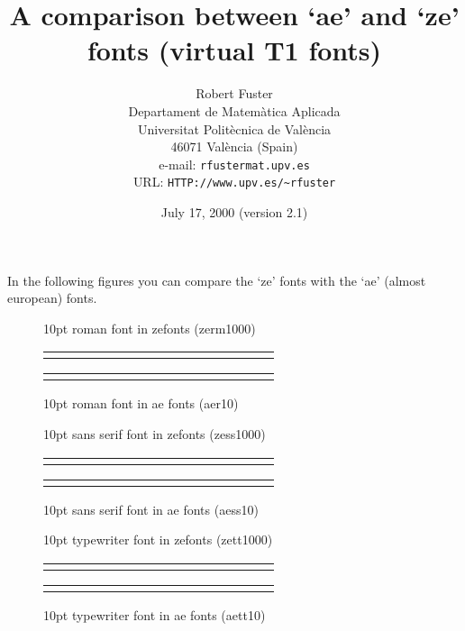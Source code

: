 \documentclass{article}
\title{A comparison between `ae' and `ze' fonts
       (virtual T1 fonts)}
\author{Robert Fuster\\
        \footnotesize Departament de Matem\`atica Aplicada\\
        \footnotesize Universitat Polit\`ecnica de Val\`encia\\
        \footnotesize 46071 Val\`encia (Spain)\\
        \footnotesize e-mail: \texttt{rfuster\@ mat.upv.es}\\
        \footnotesize URL: \texttt{HTTP://www.upv.es/\~{}rfuster}}
\date{July 17, 2000 (version 2.1)}
\newcounter{n} \newcounter{p}
\newcommand{\taula}{%
    \setcounter{n}{0}
    \setcounter{p}{0}
    \begin{center}
    \setcounter{n}{0}
    \setcounter{p}{0}
    \begin{tabular}{|c|c|c|c|c|c|c|c|c|c|c|c|c|c|c|c|}
    \hline
    \whiledo{\value{n} < 255}{%
     \symbol{\then}\stepcounter{p}\stepcounter{n}\ifthenelse{\value{p} = 16}{%
                                  \setcounter{p}{0}\\\hline
                                 }{\ifthenelse{\value{n} < 256}{&}{}%
                                     }}
    \symbol{\then}\\\hline
    \end{tabular}
    \end{center}
}
\begin{document}
\maketitle
In the following figures you can compare
the `ze' fonts with the  `ae' (almost european) fonts.
\begin{figure}
    \caption{10pt roman font in zefonts (zerm1000) \label{fig:zerm1000}}
    \taula
    \caption{10pt roman font in ae fonts (aer10) \label{fig:aer10}}
    {\renewcommand{\rmdefault}{aer}\rmfamily\selectfont\taula
    }
\end{figure}
\begin{figure}
    \caption{10pt sans serif font in zefonts (zess1000) \label{fig:zess1000}}
    \sffamily\taula
    \caption{10pt sans serif font in ae fonts (aess10) \label{fig:aess10}}
    {\renewcommand{\sfdefault}{aess}\sffamily\selectfont\taula
    }
\end{figure}
\begin{figure}
    \caption{10pt typewriter font in zefonts (zett1000) \label{fig:zett1000}}
    \ttfamily\taula
    \caption{10pt typewriter font in ae fonts (aett10) \label{fig:aett10}}
    {\renewcommand{\ttdefault}{aett}\ttfamily\selectfont\taula
    }
\end{figure}
\end{document}
